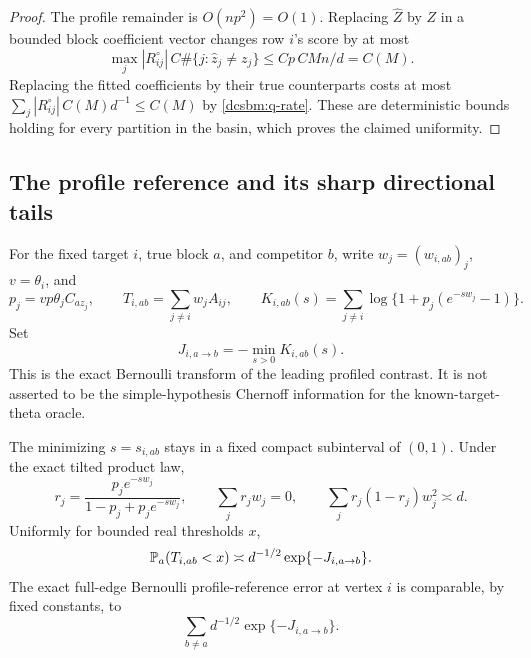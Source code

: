 \begin{proof}
The profile remainder is \(O(np^2)=O(1)\).
Replacing \(\widehat Z\) by \(Z\) in a bounded block coefficient
vector changes row \(i\)'s score by at most
\[
 \max_j|R^\circ_{ij}|\,
     C\#\{j:\widehat z_j\ne z_j\}
 \le Cp\,CMn/d=C(M).
\]
Replacing the fitted coefficients by their true counterparts
costs at most
\(
 \sum_j|R^\circ_{ij}|\,
 C(M)d^{-1}\le C(M)
\)
by \cref{dcsbm:q-rate}.  These are deterministic bounds holding
for every partition in the basin, which proves the claimed uniformity.
\end{proof}

\subsection{The profile reference and its sharp directional tails}

For the fixed target \(i\), true block \(a\), and competitor \(b\),
write \(w_j=(w_{i,ab})_j\), \(v=\theta_i\), and
\[
 p_j=vp\theta_jC_{az_j},\qquad
 T_{i,ab}=\sum_{j\ne i}w_jA_{ij},\qquad
 K_{i,ab}(s)=\sum_{j\ne i}\log\{1+p_j(e^{-sw_j}-1)\}.
\]
Set
\begin{equation}
 J_{i,a\to b}
 =-\min_{s>0}K_{i,ab}(s).
 \label{dcsbm:profile-exponent}
\end{equation}
This is the exact Bernoulli transform of the leading profiled
contrast.  It is not asserted to be the simple-hypothesis
Chernoff information for the known-target-theta oracle.

\begin{lemma}
\label{dcsbm:profile-tail}
The minimizing \(s=s_{i,ab}\) stays in a fixed compact subinterval
of \((0,1)\).  Under the exact tilted product law,
\begin{equation}
 r_j=\frac{p_je^{-sw_j}}{1-p_j+p_je^{-sw_j}},\qquad
 \sum_j r_jw_j=0,\qquad
 \sum_j r_j(1-r_j)w_j^2\asymp d .
 \label{dcsbm:tilt}
\end{equation}
Uniformly for bounded real thresholds \(x\),
\begin{equation}
 \mathbb P_a(T_{i,ab}<x)\asymp
 d^{-1/2}\exp\{-J_{i,a\to b}\}.
 \label{dcsbm:directional-tail}
\end{equation}
The exact full-edge Bernoulli profile-reference error at vertex \(i\)
is comparable, by fixed constants, to
\begin{equation}
 \sum_{b\ne a}d^{-1/2}\exp\{-J_{i,a\to b}\}.
 \label{dcsbm:reference-sum}
\end{equation}
\end{lemma}

